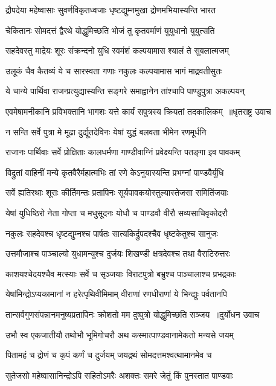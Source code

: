 \twolineshloka
{द्रौपदेया महेष्वासाः सुवर्णविकृतध्वजाः}
{धृष्टद्युम्नमुखा द्रोणमभियास्यन्ति भारत}


\twolineshloka
{चेकितानः सोमदत्तं द्वैरथे योद्धुमिच्छति}
{भोजं तु कृतवर्माणं युयुधानो युयुत्सति}


\twolineshloka
{सहदेवस्तु माद्रेयः शूरः संक्रन्दनो युधि}
{स्वमंशं कल्पयामास श्यालं ते सुबलात्मजम्}


\twolineshloka
{उलूकं चैव कैतव्यं ये च सारस्वता गणाः}
{नकुलः कल्पयामास भागं माद्रवतीसुतः}


\twolineshloka
{ये चान्ये पार्थिवा राजन्प्रत्युद्यास्यन्ति सङ्गरे}
{समाह्वानेन तांश्चापि पाण्डुपुत्रा अकल्पयन्}


\threelineshloka
{एवमेषामनीकानि प्रविभक्तानि भागशः}
{यत्ते कार्यं सपुत्रस्य क्रियतां तदकालिकम् ॥धृतराष्ट्र उवाच}
{}


\twolineshloka
{न सन्ति सर्वे पुत्रा मे मूढा दुर्द्यूतदेविनः}
{येषां युद्धं बलवता भीमेन रणमूर्धनि}


\twolineshloka
{राजानः पार्थिवाः सर्वे प्रोक्षिताः कालधर्मणा}
{गाण्डीवाग्निं प्रवेक्ष्यन्ति पतङ्गा इव पावकम्}


\twolineshloka
{विद्रुतां वाहिनीं मन्ये कृतवैरैर्महात्मभिः}
{तां रणे केऽनुयास्यन्ति प्रभग्नां पाण्डवैर्युधि}


\twolineshloka
{सर्वे ह्यतिरथाः शूराः कीर्तिमन्तः प्रतापिनः}
{सूर्यपावकयोस्तुल्यास्तेजसा समितिंजयाः}


\twolineshloka
{येषां युधिष्ठिरो नेता गोप्ता च मधुसूदनः}
{योधौ च पाण्डवौ वीरौ सव्यसाचिवृकोदरौ}


\twolineshloka
{नकुलः सहदेवश्च धृष्टद्युम्नश्च पार्षतः}
{सात्यकिर्द्रुपदश्चैव धृष्टकेतुश्च सानुजः}


\twolineshloka
{उत्तमौजाश्च पाञ्चाल्यो युधामन्युश्च दुर्जयः}
{शिखण्डी क्षत्रदेवश्च तथा वैराटिरुत्तरः}


\twolineshloka
{काशयश्चेदयश्चैव मत्स्याः सर्वे च सृञ्जयाः}
{विराटपुत्रो बभ्रुश्च पाञ्चालाश्च प्रभद्रकाः}


\twolineshloka
{येषांमिन्द्रोऽप्यकामानां न हरेत्पृथिवीमिमाम्}
{वीराणां रणधीराणां ये भिन्द्युः पर्वतानपि}


\threelineshloka
{तान्सर्वगुणसंपन्नानमनुष्यप्रतापिनः}
{क्रोशतो मम दुष्पुत्रो योद्धुमिच्छति सञ्जय ॥दुर्योधन उवाच}
{}


\twolineshloka
{उभौ स्व एकजातीयौ तथोभौ भूमिगोचरौ}
{अथ कस्मात्पाण्डवानामेकतो मन्यसे जयम्}


\twolineshloka
{पितामहं च द्रोणं च कृपं कर्णं च दुर्जयम्}
{जयद्रथं सोमदत्तमश्वत्थामानमेव च}


\twolineshloka
{सुतेजसो महेष्वासानिन्द्रोऽपि सहितोऽमरैः}
{अशक्तः समरे जेतुं किं पुनस्तात पाण्डवाः}


